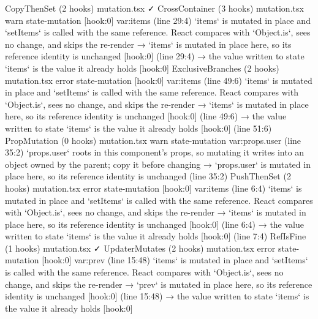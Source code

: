 \begin{sortie}
  CopyThenSet  (2 hooks)  mutation.tsx  ✓
  CrossContainer  (3 hooks)  mutation.tsx
    warn   state-mutation  [hook:0]  var:items  (line 29:4)  `items` is mutated in place and `setItems` is called with the same reference. React compares with `Object.is`, sees no change, and skips the re-render
       → `items` is mutated in place here, so its reference identity is unchanged [hook:0] (line 29:4)
       → the value written to state `items` is the value it already holds [hook:0]
  ExclusiveBranches  (2 hooks)  mutation.tsx
    error  state-mutation  [hook:0]  var:items  (line 49:6)  `items` is mutated in place and `setItems` is called with the same reference. React compares with `Object.is`, sees no change, and skips the re-render
       → `items` is mutated in place here, so its reference identity is unchanged [hook:0] (line 49:6)
       → the value written to state `items` is the value it already holds [hook:0] (line 51:6)
  PropMutation  (0 hooks)  mutation.tsx
    warn   state-mutation  var:props.user  (line 35:2)  `props.user` roots in this component's props, so mutating it writes into an object owned by the parent; copy it before changing
       → `props.user` is mutated in place here, so its reference identity is unchanged (line 35:2)
  PushThenSet  (2 hooks)  mutation.tsx
    error  state-mutation  [hook:0]  var:items  (line 6:4)  `items` is mutated in place and `setItems` is called with the same reference. React compares with `Object.is`, sees no change, and skips the re-render
       → `items` is mutated in place here, so its reference identity is unchanged [hook:0] (line 6:4)
       → the value written to state `items` is the value it already holds [hook:0] (line 7:4)
  RefIsFine  (1 hooks)  mutation.tsx  ✓
  UpdaterMutates  (2 hooks)  mutation.tsx
    error  state-mutation  [hook:0]  var:prev  (line 15:48)  `items` is mutated in place and `setItems` is called with the same reference. React compares with `Object.is`, sees no change, and skips the re-render
       → `prev` is mutated in place here, so its reference identity is unchanged [hook:0] (line 15:48)
       → the value written to state `items` is the value it already holds [hook:0]
\end{sortie}

